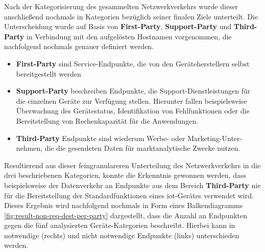 \noindent Nach der Kategorisierung des gesammelten Netzwerkverkehrs wurde dieser anschließend nochmals in Kategorien bezüglich seiner finalen Ziele unterteilt. Die Unterscheidung wurde auf Basis von \textbf{First-Party}, \textbf{Support-Party} und \textbf{Third-Party} in Verbindung mit den aufgelösten Hostnamen vorgenommen, die nachfolgend nochmals genauer definiert werden.

\begin{itemize}
	\item \textbf{First-Party} sind Service-Endpunkte, die von den Geräteherstellern selbst bereitgestellt werden
	\item \textbf{Support-Party} beschreiben Endpunkte, die Support-Dienstleistungen für die einzelnen Geräte zur Verfügung stellen. Hierunter fallen beispielsweise Überwachung des Gerätestatus, Identifikation von Fehlfunktionen oder die Bereitstellung von Rechenkapazität für die Anwendungen.
	\item \textbf{Third-Party} Endpunkte sind wiederum Werbe- oder Marketing-Unter-nehmen, die die gesendeten Daten für marktanalytische Zwecke nutzen.
\end{itemize}

\noindent Resultierend aus dieser feingranulareren Unterteilung des Netzwerkverkehrs in die drei beschriebenen Kategorien, konnte die Erkenntnis gewonnen werden, dass beispielsweise der Datenverkehr an Endpunkte aus dem Bereich \textbf{Third-Party} nie für die Bereitstellung der Standardfunktionen eines \ac{iot}-Gerätes verwendet wird. 
Dieses Ergebnis wird nachfolgend nochmals in Form eines Balkendiagramms \ref{fig:result-non-req-dest-per-party} dargestellt, dass die Anzahl an Endpunkten gegen die fünf analysierten Geräte-Kategorien beschreibt. Hierbei kann in notwendige (rechts) und nicht notwendige Endpunkte (links) unterschieden werden. 

